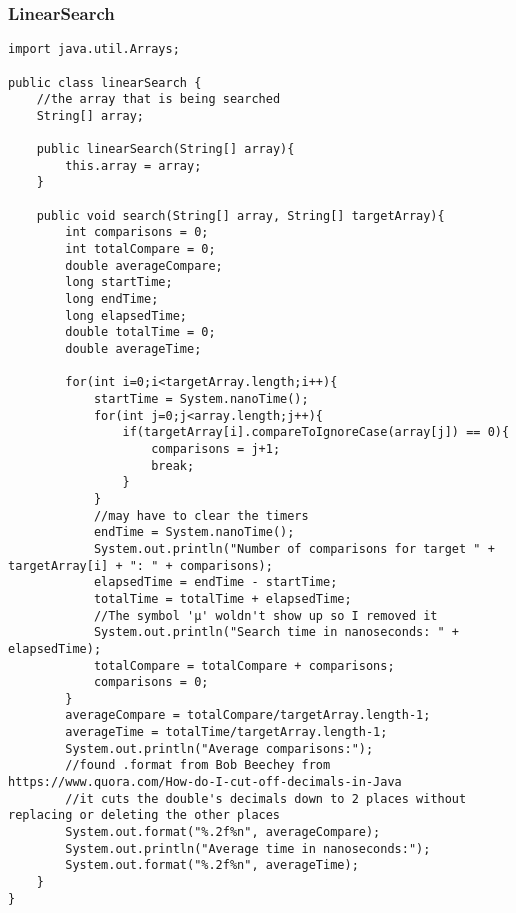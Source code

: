 \documentclass[10pt]{article}
\begin{document}
\subsubsection{LinearSearch}
\lstset{numbers=left, numberstyle=\tiny, stepnumber=1, numbersep=5pt, basicstyle=\footnotesize\ttfamily}
\begin{lstlisting}[frame=single, ]  
import java.util.Arrays;

public class linearSearch {
    //the array that is being searched
    String[] array;

    public linearSearch(String[] array){
        this.array = array;
    }

    public void search(String[] array, String[] targetArray){
        int comparisons = 0;
        int totalCompare = 0;
        double averageCompare;
        long startTime;
        long endTime;
        long elapsedTime;
        double totalTime = 0;
        double averageTime;

        for(int i=0;i<targetArray.length;i++){
            startTime = System.nanoTime();
            for(int j=0;j<array.length;j++){
                if(targetArray[i].compareToIgnoreCase(array[j]) == 0){
                    comparisons = j+1;
                    break;
                }
            }
            //may have to clear the timers
            endTime = System.nanoTime();
            System.out.println("Number of comparisons for target " + targetArray[i] + ": " + comparisons);
            elapsedTime = endTime - startTime;
            totalTime = totalTime + elapsedTime;
            //The symbol 'μ' woldn't show up so I removed it
            System.out.println("Search time in nanoseconds: " + elapsedTime);
            totalCompare = totalCompare + comparisons;
            comparisons = 0;
        }
        averageCompare = totalCompare/targetArray.length-1;
        averageTime = totalTime/targetArray.length-1;
        System.out.println("Average comparisons:");
        //found .format from Bob Beechey from https://www.quora.com/How-do-I-cut-off-decimals-in-Java
        //it cuts the double's decimals down to 2 places without replacing or deleting the other places
        System.out.format("%.2f%n", averageCompare);
        System.out.println("Average time in nanoseconds:");
        System.out.format("%.2f%n", averageTime);
    }
}
\end{lstlisting}
\end{document}

